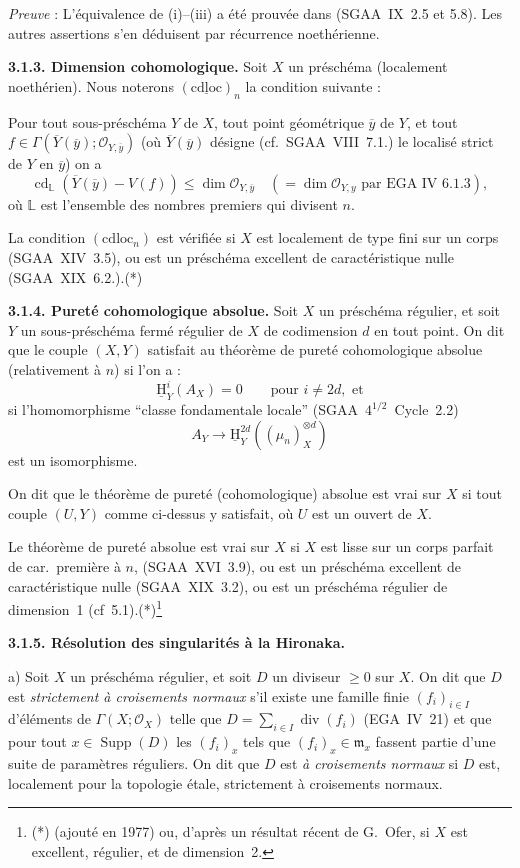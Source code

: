 \documentclass[11pt]{article}
\DeclareMathOperator{\Supp}{Supp}
\providecommand{\cO}{\mathcal{O}}
\providecommand{\fm}{\mathfrak{m}}
\renewcommand{\H}{\mathrm{H}}
\DeclareMathOperator{\cd}{cd}
\newcommand{\ol}[1]{\overline{#1}}
\providecommand{\Supp}{\operatorname{Supp}}
\providecommand{\fm}{\mathfrak m}
\begin{document}
\emph{Preuve} : L'équivalence de (i)--(iii) a été prouvée dans (SGAA~IX~2.5 et 5.8). Les autres assertions s'en déduisent par récurrence noethérienne.

\textbf{3.1.3. Dimension cohomologique.} Soit $X$ un préschéma (localement noethérien). Nous noterons $(\underline{\mathrm{cdloc}})_n$ la condition suivante :

Pour tout sous-préschéma $Y$ de $X$, tout point géométrique $\ol{y}$ de $Y$, et tout 
$f \in \Gamma(\ol{Y}(\ol{y}); \cO_{Y,\ol{y}})$ (où $\ol{Y}(\ol{y})$
désigne (cf.~SGAA~VIII~7.1.) le localisé strict de $Y$ en $\ol{y}$) on a
\[
\cd_{\mathbb{L}}(\ol{Y}(\ol{y}) - V(f)) \leqslant \dim \cO_{Y,\ol{y}} \quad (= \dim \cO_{Y,y} \text{ par EGA~IV~6.1.3}),
\]
où $\mathbb{L}$ est l'ensemble des nombres premiers qui divisent $n$.

La condition $(\mathrm{cdloc}_n)$ est vérifiée si $X$ est localement de type fini sur un corps (SGAA~XIV~3.5), ou est un préschéma excellent de caractéristique nulle (SGAA~XIX~6.2.).(*)

\textbf{3.1.4. Pureté cohomologique absolue.} Soit $X$ un préschéma régulier, et soit $Y$ un sous-préschéma fermé régulier de $X$ de codimension $d$ en tout point. On dit que le couple $(X,Y)$ satisfait au théorème de pureté cohomologique absolue (relativement à $n$) si l'on a :
\[
\underline{\H}^i_Y(A_X) = 0 \qquad \text{pour } i \neq 2d, \text{ et}
\]
si l'homomorphisme ``classe fondamentale locale'' (SGAA~$4^{1/2}$~Cycle~2.2)
\[
A_Y \longrightarrow \underline{\H}^{2d}_Y((\mu_n)^{\otimes d}_X)
\]
est un isomorphisme.

On dit que le théorème de pureté (cohomologique) absolue est vrai sur $X$ si tout couple $(U,Y)$ comme ci-dessus y satisfait, où $U$ est un ouvert de $X$.

Le théorème de pureté absolue est vrai sur $X$ si $X$ est lisse sur un corps parfait de car.~première à $n$, (SGAA~XVI~3.9), ou est un préschéma excellent de caractéristique nulle (SGAA~XIX~3.2), ou est un préschéma régulier de dimension~1 (cf~5.1).(*)\footnote{(*) (ajouté en 1977) ou, d'après un résultat récent de G.~Ofer, si $X$ est excellent, régulier, et de dimension~2.}

\textbf{3.1.5. Résolution des singularités à la Hironaka.}

a) Soit $X$ un préschéma régulier, et soit $D$ un diviseur $\geqslant 0$ sur $X$. On dit que $D$ est \emph{strictement à croisements normaux} s'il existe une famille finie $(f_i)_{i \in I}$ d'éléments de $\Gamma(X; \cO_X)$ telle que $D = \sum_{i \in I} \operatorname{div}(f_i)$ (EGA~IV~21) et que pour tout $x \in \Supp(D)$ les $(f_i)_x$ tels que $(f_i)_x \in \fm_x$ fassent partie d'une suite de paramètres réguliers. On dit que $D$ est \emph{à croisements normaux} si $D$ est, localement pour la topologie étale, strictement à croisements normaux.
\end{document}
